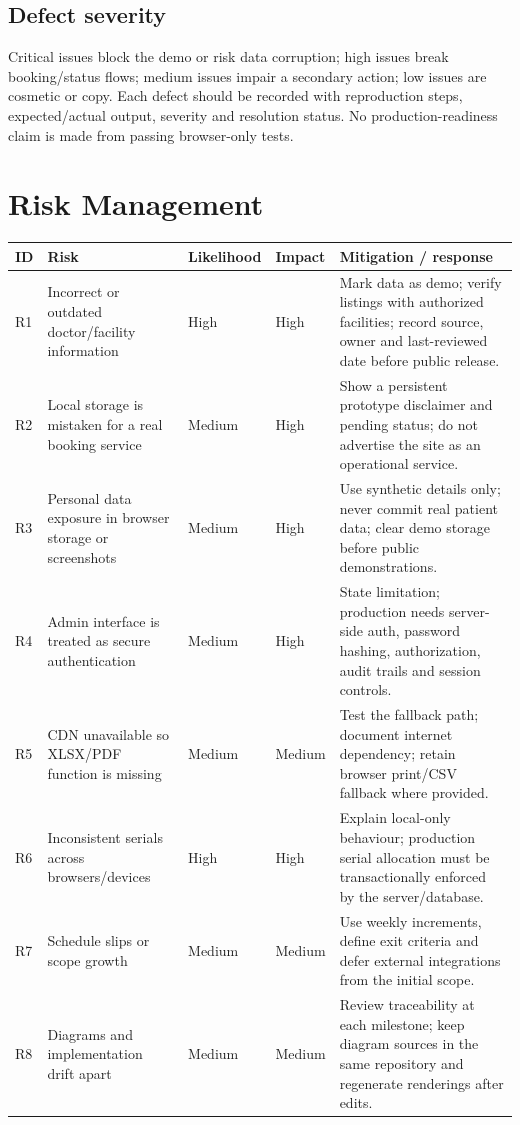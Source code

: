 \documentclass[11pt,a4paper]{article}
\begin{document}
\subsection{Defect severity}
Critical issues block the demo or risk data corruption; high issues break booking/status flows; medium issues impair a secondary action; low issues are cosmetic or copy. Each defect should be recorded with reproduction steps, expected/actual output, severity and resolution status. No production-readiness claim is made from passing browser-only tests.

\section{Risk Management}
\begin{longtable}{p{0.8cm}p{3.2cm}p{1.3cm}p{1.3cm}p{7.2cm}}
\toprule \textbf{ID} & \textbf{Risk} & \textbf{Likelihood} & \textbf{Impact} & \textbf{Mitigation / response}\\\midrule
R1 & Incorrect or outdated doctor/facility information & High & High & Mark data as demo; verify listings with authorized facilities; record source, owner and last-reviewed date before public release.\\
R2 & Local storage is mistaken for a real booking service & Medium & High & Show a persistent prototype disclaimer and pending status; do not advertise the site as an operational service.\\
R3 & Personal data exposure in browser storage or screenshots & Medium & High & Use synthetic details only; never commit real patient data; clear demo storage before public demonstrations.\\
R4 & Admin interface is treated as secure authentication & Medium & High & State limitation; production needs server-side auth, password hashing, authorization, audit trails and session controls.\\
R5 & CDN unavailable so XLSX/PDF function is missing & Medium & Medium & Test the fallback path; document internet dependency; retain browser print/CSV fallback where provided.\\
R6 & Inconsistent serials across browsers/devices & High & High & Explain local-only behaviour; production serial allocation must be transactionally enforced by the server/database.\\
R7 & Schedule slips or scope growth & Medium & Medium & Use weekly increments, define exit criteria and defer external integrations from the initial scope.\\
R8 & Diagrams and implementation drift apart & Medium & Medium & Review traceability at each milestone; keep diagram sources in the same repository and regenerate renderings after edits.\\
\bottomrule
\end{longtable}
\end{document}
